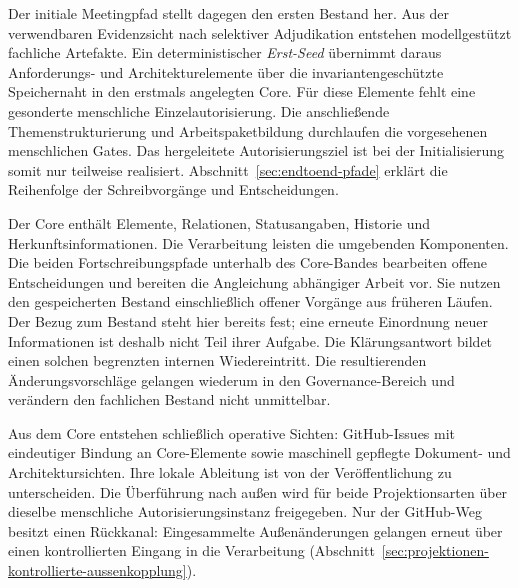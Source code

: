 Der initiale Meetingpfad stellt dagegen den ersten Bestand her.
Aus der verwendbaren Evidenzsicht nach selektiver Adjudikation
entstehen modellgestützt fachliche Artefakte. Ein deterministischer
\emph{Erst-Seed} übernimmt daraus Anforderungs- und Architekturelemente
über die invariantengeschützte Speichernaht in den erstmals
angelegten Core. Für diese Elemente fehlt eine gesonderte
menschliche Einzelautorisierung. Die anschließende Themenstrukturierung
und Arbeitspaketbildung durchlaufen die vorgesehenen menschlichen
Gates. Das hergeleitete Autorisierungsziel ist bei der Initialisierung
somit nur teilweise realisiert. Abschnitt~\ref{sec:endtoend-pfade}
erklärt die Reihenfolge der Schreibvorgänge und Entscheidungen.

Der Core enthält Elemente, Relationen, Statusangaben, Historie
und Herkunftsinformationen. Die Verarbeitung leisten die
umgebenden Komponenten. Die beiden Fortschreibungspfade unterhalb
des Core-Bandes bearbeiten offene Entscheidungen und bereiten die
Angleichung abhängiger Arbeit vor. Sie nutzen den gespeicherten
Bestand einschließlich offener Vorgänge aus früheren Läufen.
Der Bezug zum Bestand steht hier bereits fest; eine erneute
Einordnung neuer Informationen ist deshalb nicht Teil ihrer Aufgabe.
Die Klärungsantwort bildet einen solchen begrenzten internen
Wiedereintritt. Die resultierenden Änderungsvorschläge gelangen
wiederum in den Governance-Bereich und verändern den fachlichen
Bestand nicht unmittelbar.

Aus dem Core entstehen schließlich operative Sichten:
GitHub-Issues mit eindeutiger Bindung an Core-Elemente sowie
maschinell gepflegte Dokument- und Architektursichten. Ihre lokale
Ableitung ist von der Veröffentlichung zu unterscheiden. Die
Überführung nach außen wird für beide Projektionsarten über
dieselbe menschliche Autorisierungsinstanz freigegeben. Nur der
GitHub-Weg besitzt einen Rückkanal: Eingesammelte Außenänderungen
gelangen erneut über einen kontrollierten Eingang in die
Verarbeitung (Abschnitt~\ref{sec:projektionen-kontrollierte-aussenkopplung}).

